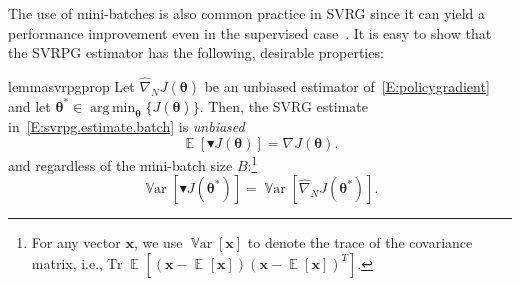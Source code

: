 \documentclass{article}
\makeatletter
\theoremstyle{remark}
\theoremstyle{definition}
\DeclareRobustCommand{\ie}{i.e.,\@\xspace}
\DeclareMathOperator*{\argmin}{arg\,min}
\DeclareMathOperator*{\EV}{\mathbb{E}}
\DeclareMathOperator{\Tr}{Tr}
\DeclareMathOperator*{\Var}{\mathbb{V}ar}
\newcommand{\EVV}[2][\ppvect \in \ppspace]{\EV_{#1}\left[{#2}\right]}
\newcommand{\vtheta}{\boldsymbol{\theta}}
\newcommand{\Reward}{\mathcal{R}}
\newcommand{\gradJ}[1]{\nabla J(#1)}
\newcommand{\gradApp}[2]{\widehat{\nabla}_{#2}J(#1)}
\newcommand{\gradBlack}[1]{\blacktriangledown J(#1)}
\newcommand{\wt}[1]{\widetilde{#1}}
\newcommand{\wh}[1]{\widehat{#1}}
\makeatother
\begin{document}
The use of mini-batches is also common practice in SVRG since it can yield a performance improvement even in the supervised case~\citep{harikandeh2015stopwasting,konevcny2016mini}. It is easy to show that the SVRPG estimator has the following, desirable properties:

\begin{restatable}[]{lemma}{svrpgprop}\label{L:svrpg.properties}
        Let $\wh{\nabla}_N J(\vtheta)$ be an unbiased estimator of~\eqref{E:policygradient}
and let $\vtheta^* \in \argmin_{\vtheta} \{J(\vtheta)\}$. Then, the SVRG estimate in~\eqref{E:svrpg.estimate.batch} is \emph{unbiased}
\begin{equation}\label{eq:unbiased}
\mathop{\mathbb{E}}
\left[\blacktriangledown J(\vtheta)\right] = \gradJ{\vtheta}.
\end{equation}
and regardless of the mini-batch size $B$:\footnote{
For any vector $\mathbf{x}$, we use $\Var[\mathbf{x}]$ to denote the trace of the covariance matrix, \ie $\Tr\EVV[]{(\mathbf{x}-\EVV[]{\mathbf{x}})(\mathbf{x}-\EVV[]{\mathbf{x}})^T}$.}
\begin{equation}\label{eq:zerovar}
	\Var\left[\gradBlack{\vtheta^*}\right] = 
    \Var\left[\wh{\nabla}_N J(\vtheta^*)\right].
\end{equation}
\end{restatable}
\end{document}
